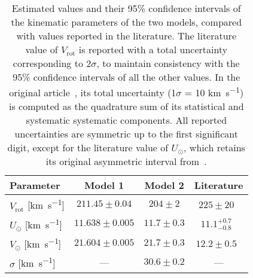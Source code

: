 \begin{table}[H]
    \centering
    \begin{tabular}{l c c | c}
        \hline
        Parameter & Model 1 & Model 2 & Literature \\
        \hline
        $V_{\text{rot}}$ [\unit{\kilo\meter\per\second}] & $211.45 \pm 0.04$ & $204 \pm 2$ & $225 \pm 20$~\cite{GalacticKinematics} \\
        $U_{\odot}$ [\unit{\kilo\meter\per\second}] & $11.638 \pm 0.005$ & $11.7 \pm 0.3$ & $11.1^{+0.7}_{-0.8}$~\cite{LocalKinematics} \\
        $V_{\odot}$ [\unit{\kilo\meter\per\second}] & $21.604 \pm 0.005$ & $21.7 \pm 0.3$ & $12.2 \pm 0.5$~\cite{LocalKinematics} \\
        $\sigma$ [\unit{\kilo\meter\per\second}] & --- & $30.6 \pm 0.2$ & --- \\
        \hline
    \end{tabular}
    \caption{%
    Estimated values and their 95\% confidence intervals of the kinematic parameters of the two models, compared with values reported in the literature. The literature value of $V_{\text{rot}}$ is reported with a total uncertainty corresponding to $2\sigma$, to maintain consistency with the 95\% confidence intervals of all the other values. In the original article~\cite{GalacticKinematics}, its total uncertainty (1$\sigma$  = 10 \unit{\kilo\meter\per\second}) is computed as the quadrature sum of its statistical and systematic systematic components. All reported uncertainties are symmetric up to the first significant digit, except for the literature value of $U_{\odot}$, which retains its original asymmetric interval from~\cite{LocalKinematics}.}\label{tab:parameter_estimates}
\end{table}
